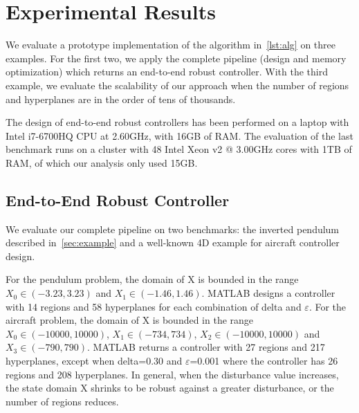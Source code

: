 \section{Experimental Results}



We evaluate a prototype implementation of the algorithm in~\autoref{lst:alg}
on three examples. For the first two, we apply the complete pipeline (design and memory optimization)
which returns an end-to-end robust controller. With the third example, we evaluate
the scalability of our approach when the number of regions and hyperplanes are in
the order of tens of thousands.


The design of end-to-end robust controllers has been performed on a laptop with Intel i7-6700HQ CPU at
2.60GHz, with 16GB of RAM. The evaluation of the last benchmark runs on a
cluster with 48 Intel Xeon v2 @ 3.00GHz cores with 1TB of RAM, of which our analysis
only used 15GB.

\subsection{End-to-End Robust Controller}

We evaluate our complete pipeline on two benchmarks: the inverted pendulum
described in~\autoref{sec:example} and a well-known 4D example for aircraft
controller design.

For the pendulum problem, the domain of X is bounded in the range $X_{0} \in
(-3.23, 3.23)$ and $X_{1}\in (-1.46, 1.46)$. MATLAB designs a controller with 14
regions and 58 hyperplanes for each combination of delta and $\varepsilon$.
For the aircraft problem, the domain of X is bounded in the range $X_{0} \in
(-10000, 10000)$, $X_{1}\in (-734, 734)$, $X_{2}\in (-10000, 10000)$ and
$X_{3}\in (-790, 790)$. MATLAB returns a controller with 27 regions and 217
hyperplanes, except when delta=0.30 and $\varepsilon$=0.001 where the controller
has 26 regions and 208 hyperplanes. In general, when the disturbance value
increases, the state domain X shrinks to be robust against a greater
disturbance, or the number of regions reduces.

